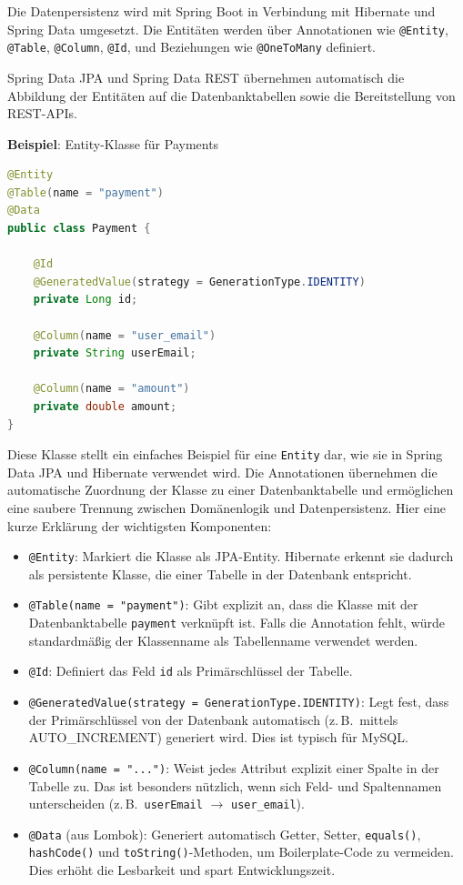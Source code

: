 Die Datenpersistenz wird mit Spring Boot in Verbindung mit Hibernate und Spring Data umgesetzt. Die Entitäten werden über Annotationen wie \texttt{@Entity}, \texttt{@Table}, \texttt{@Column}, \texttt{@Id}, und Beziehungen wie \texttt{@OneToMany} definiert.

\noindent Spring Data JPA und Spring Data REST übernehmen automatisch die Abbildung der Entitäten auf die Datenbanktabellen sowie die Bereitstellung von REST-APIs.

\noindent \textbf{Beispiel}: Entity-Klasse für Payments
\begin{lstlisting}[language=Java, caption={JPA-Entity \texttt{Payment}}, label={lst:Payment-entity}]
@Entity
@Table(name = "payment")
@Data
public class Payment {
	
	@Id
	@GeneratedValue(strategy = GenerationType.IDENTITY)
	private Long id;
	
	@Column(name = "user_email")
	private String userEmail;
	
	@Column(name = "amount")
	private double amount;
}
\end{lstlisting}

\noindent Diese Klasse stellt ein einfaches Beispiel für eine \texttt{Entity} dar, wie sie in Spring Data JPA und Hibernate verwendet wird. Die Annotationen übernehmen die automatische Zuordnung der Klasse zu einer Datenbanktabelle und ermöglichen eine saubere Trennung zwischen Domänenlogik und Datenpersistenz. Hier eine kurze Erklärung der wichtigsten Komponenten:

\begin{itemize}
	\item \texttt{@Entity}: Markiert die Klasse als JPA-Entity. Hibernate erkennt sie dadurch als persistente Klasse, die einer Tabelle in der Datenbank entspricht.
	
	\item \texttt{@Table(name = "payment")}: Gibt explizit an, dass die Klasse mit der Datenbanktabelle \texttt{payment} verknüpft ist. Falls die Annotation fehlt, würde standardmäßig der Klassenname als Tabellenname verwendet werden.
	
	\item \texttt{@Id}: Definiert das Feld \texttt{id} als Primärschlüssel der Tabelle.
	
	\item \texttt{@GeneratedValue(strategy = GenerationType.IDENTITY)}: Legt fest, dass der Primärschlüssel von der Datenbank automatisch (z.\,B.\ mittels AUTO\_INCREMENT) generiert wird. Dies ist typisch für MySQL.
	
	\item \texttt{@Column(name = "...")}: Weist jedes Attribut explizit einer Spalte in der Tabelle zu. Das ist besonders nützlich, wenn sich Feld- und Spaltennamen unterscheiden (z.\,B.\ \texttt{userEmail} $\rightarrow$ \texttt{user\_email}).
	
	\item \texttt{@Data} (aus Lombok): Generiert automatisch Getter, Setter, \texttt{equals()}, \texttt{hashCode()} und \texttt{toString()}-Methoden, um Boilerplate-Code zu vermeiden. Dies erhöht die Lesbarkeit und spart Entwicklungszeit.
\end{itemize}

